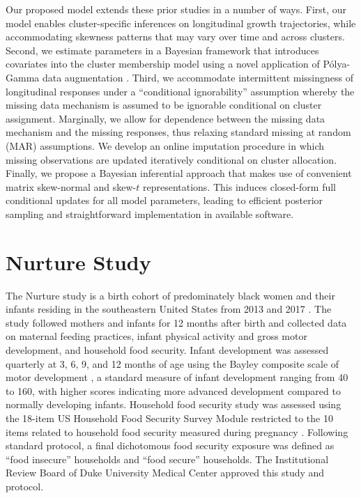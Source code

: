 \documentclass[useAMS,usenatbib,referee]{biom}
\begin{document}
Our proposed model extends these prior studies in a number of ways. First, our model enables cluster-specific inferences on longitudinal growth trajectories, while accommodating skewness patterns that may vary over time and across clusters. Second, we estimate parameters in a Bayesian framework that introduces covariates into the cluster membership model using a novel application of P\'olya-Gamma data augmentation \citep{polson2013bayesian}. Third, we accommodate intermittent missingness of longitudinal responses under a ``conditional ignorability'' assumption whereby the missing data mechanism is assumed to be ignorable conditional on cluster assignment. Marginally, we allow for dependence between the missing data mechanism and the missing responses, thus relaxing standard missing at random (MAR) assumptions. We develop an online imputation procedure in which missing observations are updated iteratively conditional on cluster allocation. Finally, we propose a Bayesian inferential approach that makes use of convenient matrix skew-normal and skew-$t$ representations. This induces closed-form full conditional updates for all model parameters, leading to efficient posterior sampling and straightforward implementation in available software.

\section{Nurture Study}
\label{s:nurt}
The Nurture study is a birth cohort of predominately black women and their infants residing in the southeastern United States from 2013 and 2017 \citep{neelon2017cohort}. The study followed mothers and infants for 12 months after birth and collected data on maternal feeding practices, infant physical activity and gross motor development, and household food security. Infant development was assessed quarterly at 3, 6, 9, and 12 months of age using the Bayley composite scale of motor development \citep{bayley2009bayley}, a standard measure of infant development ranging from 40 to 160, with higher scores indicating more advanced development compared to normally developing infants. Household food security study was assessed using the 18-item US Household Food Security Survey Module restricted to the 10 items related to household food security measured during pregnancy \citep{USDA}. Following standard protocol, a final dichotomous food security exposure was defined as ``food insecure'' households and ``food secure'' households. The Institutional Review Board of Duke University Medical Center approved this study and protocol.
\end{document}
